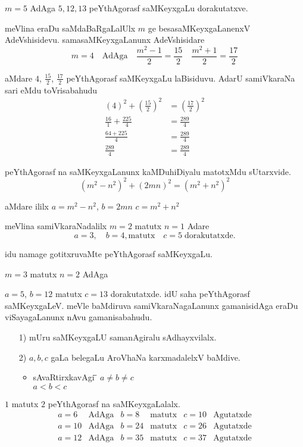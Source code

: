 $m=5$ AdAga $5,12,13$ peYthAgorasf saMKeyxgaLu dorakutatxve.

meVlina eraDu saMdaBaRgaLalUlx $m$ ge besasaMKeyxgaLanenxV AdeVshisidevu.
sama\-saMKeyxgaLanunx AdeVshisidare
$$
m=4 \quad \text{AdAga}\quad \frac{m^2-1}{2}=\frac{15}{2} \quad \frac{m^2+1}{2} = \frac{17}{2}
$$

aMdare $4$, $\frac{15}{2}$, $\frac{17}{2}$ peYthAgorasf saMKeyxgaLu laBisiduvu. AdarU samiVkaraNa sari eMdu toVrisabahudu
\begin{align*}
(4)^2+\left(\frac{15}{2}\right)^2 &= \left(\frac{17}{2}\right)^2\\
\frac{16}{1}+\frac{225}{4} &= \frac{289}{4}\\
\frac{64+225}{4} &= \frac{289}{4}\\
\frac{289}{4}&= \frac{289}{4}
\end{align*}

peYthAgorasf na saMKeyxgaLanunx kaMDuhiDiyalu matotxMdu sUtarxvide.
$$
\left(m^2-n^2\right)^2 + (2mn)^2 = (m^2+n^2)^2
$$

aMdare ililx\; $a=m^2-n^2$, \quad $b=2mn$ \quad {} \quad $c=m^2+n^2$

meVlina samiVkaraNadalilx $m=2$ matutx $n=1$ Adare
$$
a=3,\quad b=4, \text{matutx} \quad c=5 \; \text{dorakutatxde}.
$$

idu namage gotitxruvaMte peYthAgorasf saMKeyxgaLu.

$m=3$ \quad matutx \quad $n=2$ \quad AdAga

$a=5$, \quad $b=12$ \quad matutx\; $c=13$ \quad dorakutatxde. idU saha peYthAgorasf saMKeyxgaLeV. meVle baMdiruva samiVkaraNagaLanunx gamanisidAga eraDu viSayagaLanunx nAvu gamanisabahudu.
\begin{enumerate}
\item[{\rm 1)}] mUru saMKeyxgaLU samanAgiralu sAdhayxvilalx.\\[-0.75cm]
\item[{\rm 2)}] $a,b,c$ gaLa belegaLu AroVhaNa karxmadalelxV baMdive.\\[-0.75cm]
\begin{itemize}
\item \begin{tabbing}
sAvaRtirxkavAgi \;\;
\= \= $a\neq  b \neq c$ \\
\> \> $a < b < c$
 \end{tabbing} 
\end{itemize}
\end{enumerate}

$1$ matutx $2$ peYthAgorasf na saMKeyxgaLalalx.
$$
\begin{array}{lclclc}
a=6 & \text{AdAga} &  b=8  & \text{matutx}  & c=10 &\text{Agutatxde}\\  
a=10 & \text{AdAga} & b=24  & \text{matutx} & c=26 &\text{Agutatxde}\\ 
a=12 & \text{AdAga} & b=35  & \text{matutx} & c=37 &\text{Agutatxde}
\end{array}
$$

